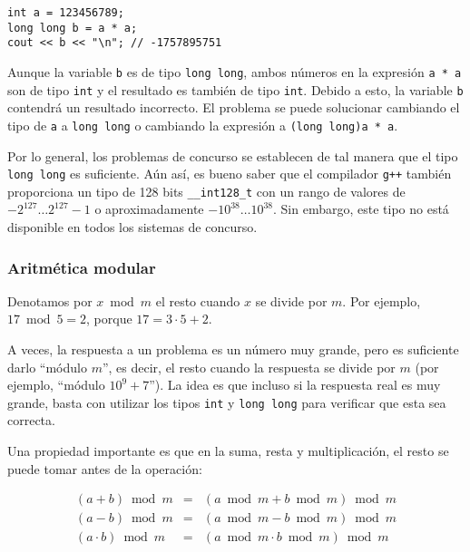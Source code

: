 \begin{lstlisting}
int a = 123456789;
long long b = a * a;
cout << b << "\n"; // -1757895751
\end{lstlisting}

Aunque la variable \texttt{b} es de tipo \texttt{long long},
ambos números en la expresión \texttt{a * a}
son de tipo \texttt{int} y el resultado es
también de tipo \texttt{int}.
Debido a esto, la variable \texttt{b} contendrá
un resultado incorrecto.
El problema se puede solucionar cambiando el tipo
de \texttt{a} a \texttt{long long} o
cambiando la expresión a \texttt{(long long)a * a}.

Por lo general, los problemas de concurso se establecen de tal manera que
el tipo \texttt{long long} es suficiente.
Aún así, es bueno saber que
el compilador \texttt{g++} también proporciona
un tipo de 128 bits \texttt{\_\_int128\_t}
con un rango de valores de
$-2^{127} \ldots 2^{127}-1$ o aproximadamente $-10^{38} \ldots 10^{38}$.
Sin embargo, este tipo no está disponible en todos los sistemas de concurso.

\subsubsection{Aritmética modular}


Denotamos por $x \bmod m$ el resto
cuando $x$ se divide por $m$.
Por ejemplo, $17 \bmod 5 = 2$,
porque $17 = 3 \cdot 5 + 2$.

A veces, la respuesta a un problema es un
número muy grande, pero es suficiente
darlo ``módulo $m$'', es decir,
el resto cuando la respuesta se divide por $m$
(por ejemplo, ``módulo $10^9+7$'').
La idea es que incluso si la respuesta real
es muy grande, basta con utilizar los tipos
\texttt{int} y \texttt{long long} para verificar
que esta sea correcta.

Una propiedad importante es que
en la suma, resta y multiplicación,
el resto se puede tomar antes de la operación:

\[
    \begin{array}{rcr}
        (a+b) \bmod m       & = & (a \bmod m + b \bmod m) \bmod m     \\
        (a-b) \bmod m       & = & (a \bmod m - b \bmod m) \bmod m     \\
        (a \cdot b) \bmod m & = & (a \bmod m \cdot b \bmod m) \bmod m
    \end{array}
\]


